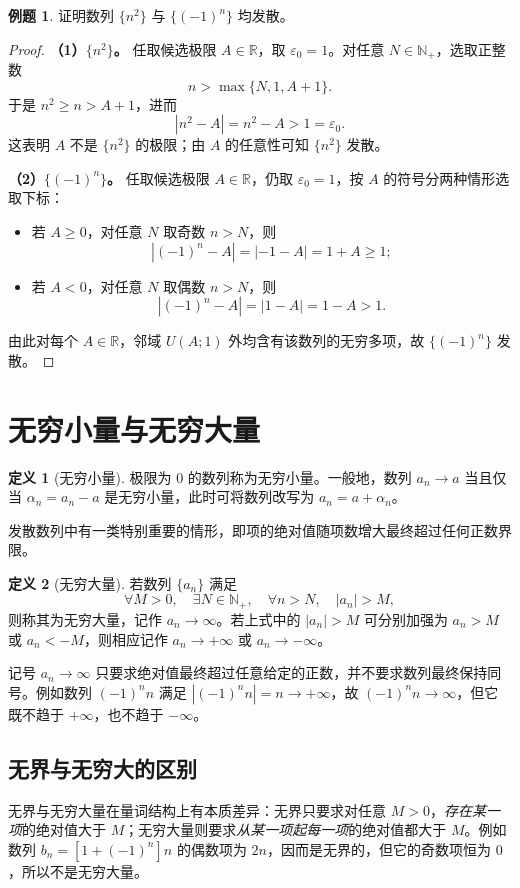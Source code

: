 \documentclass[UTF8, fontset=fandol, a4paper, 12pt]{ctexart}
\newcommand{\R}{\mathbb R}
\newcommand{\Nplus}{\mathbb N_{+}}
\theoremstyle{definition}
\newtheorem{definition}{定义}[section]
\newtheorem{example}{例题}
\begin{document}
\begin{example}
证明数列 $\{n^2\}$ 与 $\{(-1)^n\}$ 均发散。
\end{example}
\begin{proof}
\textbf{（1）$\{n^2\}$。}
任取候选极限 $A\in\R$，取 $\varepsilon_0=1$。对任意 $N\in\Nplus$，选取正整数
\[
 n>\max\{N,1,A+1\}.
\]
于是 $n^2\ge n>A+1$，进而
\[
 |n^2-A|=n^2-A>1=\varepsilon_0.
\]
这表明 $A$ 不是 $\{n^2\}$ 的极限；由 $A$ 的任意性可知 $\{n^2\}$ 发散。

\medskip
\textbf{（2）$\{(-1)^n\}$。}
任取候选极限 $A\in\R$，仍取 $\varepsilon_0=1$，按 $A$ 的符号分两种情形选取下标：
\begin{itemize}[leftmargin=2em]
\item 若 $A\ge0$，对任意 $N$ 取奇数 $n>N$，则
\[
 |(-1)^n-A|=|-1-A|=1+A\ge1;
\]
\item 若 $A<0$，对任意 $N$ 取偶数 $n>N$，则
\[
 |(-1)^n-A|=|1-A|=1-A>1.
\]
\end{itemize}
由此对每个 $A\in\R$，邻域 $U(A;1)$ 外均含有该数列的无穷多项，故 $\{(-1)^n\}$ 发散。
\end{proof}

\section{无穷小量与无穷大量}
\begin{definition}[无穷小量]
极限为 $0$ 的数列称为无穷小量。一般地，数列 $a_n\to a$ 当且仅当 $\alpha_n=a_n-a$ 是无穷小量，此时可将数列改写为 $a_n=a+\alpha_n$。
\end{definition}

发散数列中有一类特别重要的情形，即项的绝对值随项数增大最终超过任何正数界限。

\begin{definition}[无穷大量]
若数列 $\{a_n\}$ 满足
\[
 \forall M>0,\quad\exists N\in\Nplus,\quad
 \forall n>N,\quad |a_n|>M,
\]
则称其为无穷大量，记作 $a_n\to\infty$。若上式中的 $|a_n|>M$ 可分别加强为 $a_n>M$ 或 $a_n<-M$，则相应记作 $a_n\to+\infty$ 或 $a_n\to-\infty$。
\end{definition}

记号 $a_n\to\infty$ 只要求绝对值最终超过任意给定的正数，并不要求数列最终保持同号。例如数列 $(-1)^n n$ 满足 $|(-1)^n n|=n\to+\infty$，故 $(-1)^n n\to\infty$，但它既不趋于 $+\infty$，也不趋于 $-\infty$。

\subsection*{无界与无穷大的区别}
无界与无穷大量在量词结构上有本质差异：无界只要求对任意 $M>0$，\emph{存在某一项}的绝对值大于 $M$；无穷大量则要求\emph{从某一项起每一项}的绝对值都大于 $M$。例如数列 $b_n=[1+(-1)^n]n$ 的偶数项为 $2n$，因而是无界的，但它的奇数项恒为 $0$，所以不是无穷大量。
\end{document}

